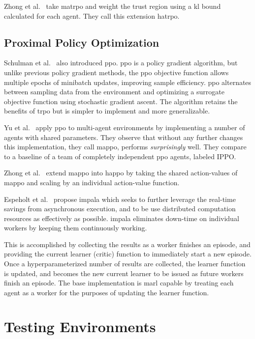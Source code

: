 Zhong et al.~\cite{zhong2024} take \gls{matrpo} and weight the 
trust region using a \gls{kl} bound calculated for each agent.
They call this extension \gls{hatrpo}.

    \subsection*{Proximal Policy Optimization}

Schulman et al.~\cite{schulman2017a} also introduced \gls{ppo}.
\Gls{ppo} is a policy gradient algorithm, but unlike previous 
policy gradient methods, the \gls{ppo} objective function allows 
multiple epochs of minibatch updates, improving sample efficiency. 
\Gls{ppo} alternates between sampling data from the environment and 
optimizing a surrogate objective function using stochastic gradient ascent. 
The algorithm retains the benefits of \gls{trpo} but is simpler to 
implement and more generalizable.

Yu et al.~\cite*{yu2022} apply \gls{ppo} to multi-agent environments
by implementing a number of agents with shared parameters.
They observe that without any further changes this implementation,
they call \gls{mappo}, performs \emph{surprisingly} well.
They compare to a baseline of a team of completely independent 
\gls{ppo} agents, labeled IPPO.

Zhong et al.~\cite{zhong2024} extend \gls{mappo} 
into \gls{happo} by taking the shared action-values of 
\gls{mappo} and scaling by an individual action-value function.

Espeholt et al.~\cite{espeholt2018} propose \gls{impala} which seeks 
to further leverage the real-time savings from asynchronous execution, 
and to be use distributed computation resources as effectively as possible.
\Gls{impala} eliminates down-time on individual workers by keeping 
them continuously working.

This is accomplished by collecting the results as a worker finishes an
episode, and providing the current learner (critic) function
to immediately start a new episode. 
Once a hyperparameterized number of results are collected, 
the learner function is updated, and becomes the new current learner
to be issued as future workers finish an episode.
The base implementation is \gls{marl} capable by treating each agent
as a worker for the purposes of updating the learner function.

\section{Testing Environments}

